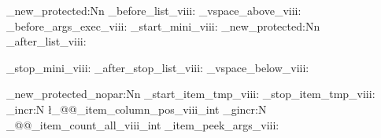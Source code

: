 %
\cs_new_protected:Nn \@@_before_list_viii:
  {
    \@@_vspace_above_viii:
    \@@_before_args_exec_viii:
    \@@_start_mini_viii:
  }
%
%
\cs_new_protected:Nn \@@_after_list_viii:
  {

    \@@_stop_mini_viii:
    \@@_after_stop_list_viii:
    \@@_vspace_below_viii:
  }
%
%
%
\cs_new_protected_nopar:Nn \@@_start_item_tmp_viii:
  {
    \@@_stop_item_tmp_viii:
    \int_incr:N \l_@@_item_column_pos_viii_int
    \int_gincr:N \g_@@_item_count_all_viii_int
    \@@_item_peek_args_viii:
  }
